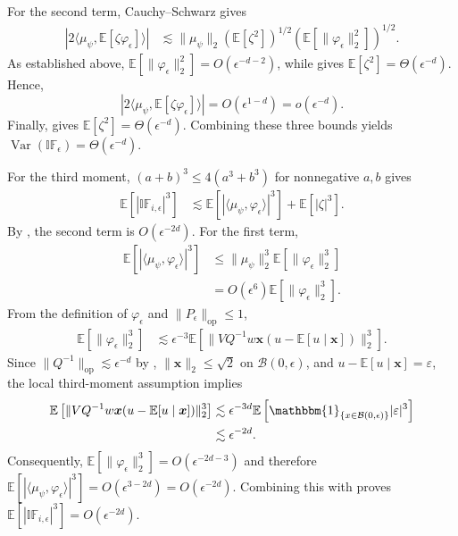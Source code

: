 \documentclass[11pt]{article}
\begin{document}
\begin{appendices}
For the second term, Cauchy--Schwarz gives
\begin{align*}
    |2\langle \mu_{\psi}, \mathbb{E}[\zeta \varphi_{\epsilon}]\rangle|
    &\lesssim \|\mu_\psi\|_2
    \left(\mathbb{E}[\zeta^2]\right)^{1/2}
    \left(\mathbb{E}[\|\varphi_{\epsilon}\|_2^2]\right)^{1/2}.
\end{align*}
As established above, $\mathbb{E}[\|\varphi_{\epsilon}\|_2^2]=O(\epsilon^{-d-2})$, while  gives $\mathbb{E}[\zeta^2]=\Theta(\epsilon^{-d})$. Hence,
\[
    |2\langle \mu_{\psi}, \mathbb{E}[\zeta \varphi_{\epsilon}]\rangle|
    = O(\epsilon^{1-d})=o(\epsilon^{-d}).
\]
Finally,  gives $\mathbb{E}[\zeta^2]=\Theta(\epsilon^{-d})$. Combining these three bounds yields $\operatorname{Var}(\mathbb{IF}_{\epsilon})=\Theta(\epsilon^{-d})$.

For the third moment, $(a+b)^3\leq4(a^3+b^3)$ for nonnegative $a,b$ gives
\begin{align*}
    \mathbb{E}[|\mathbb{IF}_{i,\epsilon}|^3]
    &\lesssim \mathbb{E}[|\langle\mu_\psi,\varphi_\epsilon\rangle|^3]
    +\mathbb{E}[|\zeta|^3].
\end{align*}
By , the second term is $O(\epsilon^{-2d})$. For the first term,
\begin{align*}
    \mathbb{E}[|\langle\mu_\psi,\varphi_\epsilon\rangle|^3]
    &\leq \|\mu_\psi\|_2^3\mathbb{E}[\|\varphi_\epsilon\|_2^3] \\
    &= O(\epsilon^6)\mathbb{E}[\|\varphi_\epsilon\|_2^3].
\end{align*}
From the definition of $\varphi_\epsilon$ and $\|P_\epsilon\|_{\operatorname{op}}\leq1$,
\begin{align*}
    \mathbb{E}[\|\varphi_{\epsilon}\|_2^3]
    &\lesssim \epsilon^{-3}\mathbb{E}\left[\|VQ^{-1}w\boldsymbol{x}(u-\mathbb{E}[u\mid \boldsymbol{x}])\|_2^3\right].
\end{align*}
Since $\|Q^{-1}\|_{\operatorname{op}}\lesssim\epsilon^{-d}$ by , $\|\boldsymbol{x}\|_2\leq\sqrt{2}$ on $\mathcal{B}(0,\epsilon)$, and $u-\mathbb{E}[u\mid \boldsymbol{x}]=\varepsilon$, the local third-moment assumption implies
\begin{align*}
    \mathbb{E}\left[\|VQ^{-1}w\boldsymbol{x}(u-\mathbb{E}[u\mid \boldsymbol{x}])\|_2^3\right]
    &\lesssim \epsilon^{-3d}\mathbb{E}\left[\mathbbm{1}_{\{x\in\mathcal{B}(0,\epsilon)\}}|\varepsilon|^3\right] \\
    &\lesssim \epsilon^{-2d}.
\end{align*}
Consequently, $\mathbb{E}[\|\varphi_\epsilon\|_2^3]=O(\epsilon^{-2d-3})$ and therefore $\mathbb{E}[|\langle\mu_\psi,\varphi_\epsilon\rangle|^3]=O(\epsilon^{3-2d})=O(\epsilon^{-2d})$. Combining this with  proves $\mathbb{E}[|\mathbb{IF}_{i,\epsilon}|^3]=O(\epsilon^{-2d})$.


\end{appendices}
\end{document}
